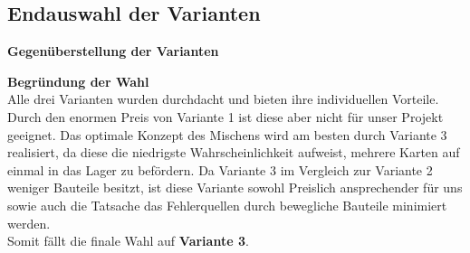 \subsection{Endauswahl der Varianten}

\textbf{\large{Gegenüberstellung der Varianten}}

\begin{table}[H]
\centering
{}
    \caption{Vergleich der Varianten}
\end{table}

\textbf{\large{Begründung der Wahl}}\\
Alle drei Varianten wurden durchdacht und bieten ihre individuellen Vorteile. Durch den enormen Preis von
Variante 1 ist diese aber nicht für unser Projekt geeignet. Das optimale Konzept des Mischens wird am besten durch
Variante 3 realisiert, da diese die niedrigste Wahrscheinlichkeit aufweist, mehrere Karten auf einmal in das Lager zu befördern.
Da Variante 3 im Vergleich zur Variante 2 weniger Bauteile besitzt, ist diese Variante sowohl Preislich ansprechender für uns
sowie auch die Tatsache das Fehlerquellen durch bewegliche Bauteile minimiert werden. \\
Somit fällt die finale Wahl auf \textbf{Variante 3}.



